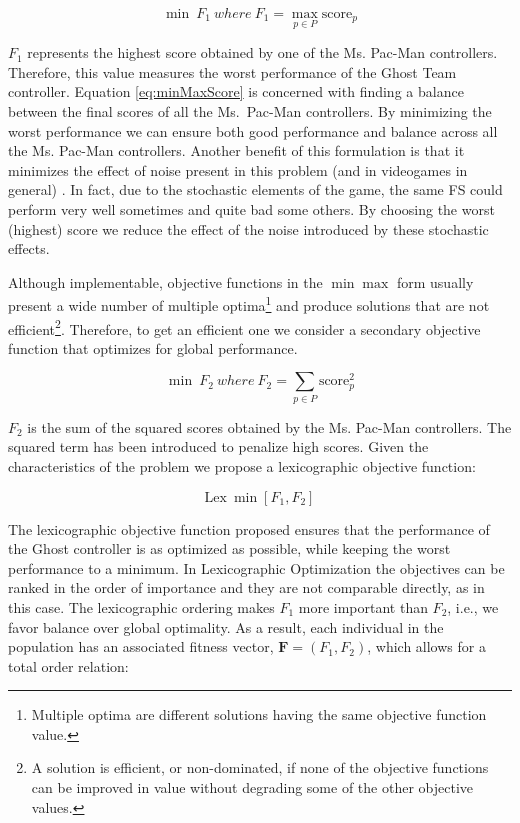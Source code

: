 \documentclass[journal]{IEEEtran}
\begin{document}
\begin{equation}
\label{eq:minMaxScore}
	\min \: F_1 \: where \: F_1 = \max_{p \in P} \text{score}_p
\end{equation}

$F_1$ represents the highest score obtained by one of the Ms. Pac-Man controllers. Therefore, this value measures the worst performance of the Ghost Team controller. Equation \eqref{eq:minMaxScore} is concerned with finding a balance between the final scores of all the Ms.\  Pac-Man controllers. By minimizing the worst performance we can ensure both good performance and balance across all the Ms. Pac-Man controllers. Another benefit of this formulation is that it minimizes the effect of noise present in this problem (and in videogames in general) \cite{Mora12}. In fact, due to the stochastic elements of the game, the same FS could perform very well sometimes and quite bad some others. By choosing the worst (highest) score we reduce the effect of the noise introduced by these stochastic effects.

Although implementable, objective functions in the $\min \max$ form usually present a wide number of multiple optima\footnote{Multiple optima are different solutions having the same objective function value.} and produce solutions that are not efficient\footnote{A solution is efficient, or non-dominated, if none of the objective functions can be improved in value without degrading some of the other objective values.}. Therefore, to get an efficient one we consider a secondary objective function that optimizes for global performance.

\begin{equation}
\label{eq:minSquareScore}
	\min \: F_2 \: where \: F_2 = \sum_{p \in P} \text{score}_p^2
\end{equation}

$F_2$ is the sum of the squared scores obtained by the Ms. Pac-Man controllers. The squared term has been introduced to penalize high scores. Given the characteristics of the problem we propose a lexicographic objective function:

\begin{equation}
\label{eq:lexicographic}
	\text{Lex} \: \min [F_1,F_2]
\end{equation}

The lexicographic objective function proposed ensures that the performance of the Ghost controller is as optimized as possible, while keeping the worst performance to a minimum. In Lexicographic Optimization \cite{Dylan2010} the objectives can be ranked in the order of importance and they are not comparable directly, as in this case. The lexicographic ordering makes $F_1$ more important than $F_2$, i.e., we favor balance over global optimality. As a result, each individual in the population has an associated fitness vector, $\mathbf{F}=(F_1,F_2)$, which allows for a total order relation:
\end{document}
